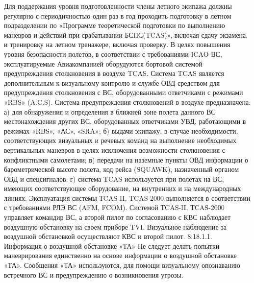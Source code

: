 Для поддержания уровня подготовленности члены летного экипажа должны регулярно с периодичностью один раз в год проходить подготовку в летном подразделении по «Программе теоретической подготовки по выполнению маневров и действий при срабатывании БСПС(TCAS)», включая сдачу экзамена, и тренировку на летном тренажере, включая проверку.
В целях повышения уровня безопасности полетов, в соответствии с требованиями ICAO ВС, эксплуатируемые Авиакомпанией оборудуются бортовой системой предупреждения столкновения в воздухе TCAS.
Система TCAS является дополнительным к визуальному контролю и службе ОВД средством для предупреждения столкновения с ВС, оборудованными ответчиками с режимами «RBS» (A.C.S).
Система предупреждения столкновений в воздухе предназначена:
а)	для обнаружения и определения в ближней зоне полета данного ВС местонахождения других ВС, оборудованных ответчиками УВД, работающими в режимах «RBS», «АС», «SRA»;
б)	выдачи экипажу, в случае необходимости, соответствующих визуальных и речевых команд на выполнение необходимых вертикальных маневров в целях исключения возможности столкновения с конфликтными самолетами;
в)	передачи на наземные пункты ОВД информации о барометрической высоте полета, код рейса (SQUAWK), назначенный органом ОВД и спецсигналов;
г)	система TCAS используется при полетах на ВС, имеющих соответствующее оборудование, на внутренних и на международных линиях.
Эксплуатация системы ТCAS-II, TCAS-2000 выполняется в соответствии с требованиями РЛЭ ВС (AFM, FCOM).
Системой ТCAS-II, ТCAS-2000 управляет командир ВС, а второй пилот по согласованию с КВС наблюдает воздушную обстановку на своем приборе TVI.
Визуальное наблюдение за воздушной обстановкой осуществляют КВС и второй пилот.
8.18.1.1.	Информация о воздушной обстановке «ТА»
Не следует делать попытки маневрирования единственно на основе информации о воздушной обстановке «ТА». Сообщения «ТА» используются, для помощи визуальному опознаванию встречного ВС и предупреждению о возникновения угрозы.

